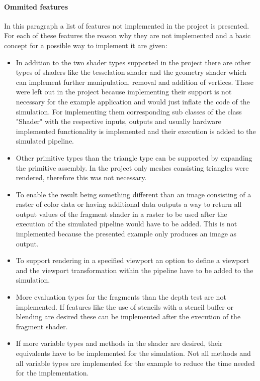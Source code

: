 \paragraph{Ommited features}

In this paragraph a list of features not implemented in the project is presented. For each of these features the reason why they are not implemented and a basic concept for a possible way to implement it are given:

\begin{itemize}
\item In addition to the two shader types supported in the project there are other types of shaders like the tesselation shader and the geometry shader which can implement further manipulation, removal and addition of vertices. These were left out in the project because implementing their support is not necessary for the example application and would just inflate the code of the simulation. For implementing them corresponding sub classes of the class "Shader" with the respective inputs, outputs and usually hardware implemented functionality is implemented and their execution is added to the simulated pipeline.

\item Other primitive types than the triangle type can be supported by expanding the primitive assembly. In the project only meshes consisting triangles were rendered, therefore this was not necessary.

\item To enable the result being something different than an image consisting of a raster of color data or having additional data outputs a way to return all output values of the fragment shader in a raster to be used after the execution of the simulated pipeline would have to be added. This is not implemented because the presented example only produces an image as output.

\item To support rendering in a specified viewport an option to define a viewport and the viewport transformation within the pipeline have to be added to the simulation.

\item More evaluation types for the fragments than the depth test are not implemented. If features like the use of stencils with a stencil buffer or blending are desired these can be implemented after the execution of the fragment shader.

\item If more variable types and methods in the shader are desired, their equivalents have to be implemented for the simulation. Not all methods and all variable types are implemented for the example to reduce the time needed for the implementation.
\end{itemize}

